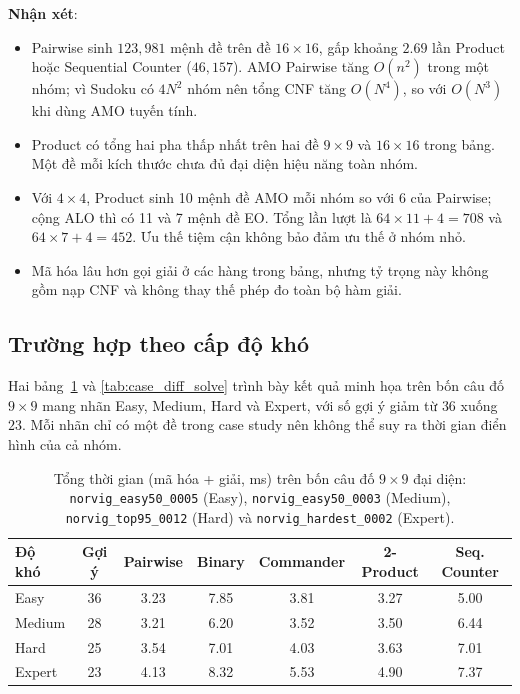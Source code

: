\documentclass[a4paper,fleqn,nologo]{cas-sc}
\begin{document}
\textbf{Nhận xét}:
\begin{itemize}
    \item Pairwise sinh $123,981$ mệnh đề trên đề $16\times16$, gấp khoảng $2.69$ lần Product hoặc Sequential Counter ($46,157$). AMO Pairwise tăng $O(n^2)$ trong một nhóm; vì Sudoku có $4N^2$ nhóm nên tổng CNF tăng $O(N^4)$, so với $O(N^3)$ khi dùng AMO tuyến tính.
    \item Product có tổng hai pha thấp nhất trên hai đề $9\times9$ và $16\times16$ trong bảng. Một đề mỗi kích thước chưa đủ đại diện hiệu năng toàn nhóm.
    \item Với $4\times4$, Product sinh 10 mệnh đề AMO mỗi nhóm so với 6 của Pairwise; cộng ALO thì có 11 và 7 mệnh đề EO. Tổng lần lượt là $64\times11+4=708$ và $64\times7+4=452$. Ưu thế tiệm cận không bảo đảm ưu thế ở nhóm nhỏ.
    \item Mã hóa lâu hơn gọi giải ở các hàng trong bảng, nhưng tỷ trọng này không gồm nạp CNF và không thay thế phép đo toàn bộ hàm giải.
\end{itemize}

\subsection{Trường hợp theo cấp độ khó}
Hai bảng~\ref{tab:case_diff} và \ref{tab:case_diff_solve} trình bày kết quả minh họa trên bốn câu đố $9\times9$ mang nhãn Easy, Medium, Hard và Expert, với số gợi ý giảm từ $36$ xuống $23$. Mỗi nhãn chỉ có một đề trong case study nên không thể suy ra thời gian điển hình của cả nhóm.

\begin{table}[pos=!htbp]
\centering
\small
\caption{Tổng thời gian (mã hóa + giải, ms) trên bốn câu đố $9\times9$ đại diện: \texttt{norvig\_easy50\_0005} (Easy), \texttt{norvig\_easy50\_0003} (Medium), \texttt{norvig\_top95\_0012} (Hard) và \texttt{norvig\_hardest\_0002} (Expert).}
\label{tab:case_diff}
\begin{tabular}{@{}l c c c c c c@{}}
\toprule
\textbf{Độ khó} & \textbf{Gợi ý} & \textbf{Pairwise} & \textbf{Binary} & \textbf{Commander} & \textbf{2-Product} & \textbf{Seq. Counter} \\
\midrule
Easy   & 36 & 3.23 & 7.85 & 3.81 & 3.27 & 5.00 \\
Medium & 28 & 3.21 & 6.20 & 3.52 & 3.50 & 6.44 \\
Hard   & 25 & 3.54 & 7.01 & 4.03 & 3.63 & 7.01 \\
Expert & 23 & 4.13 & 8.32 & 5.53 & 4.90 & 7.37 \\
\bottomrule
\end{tabular}
\end{table}
\end{document}
